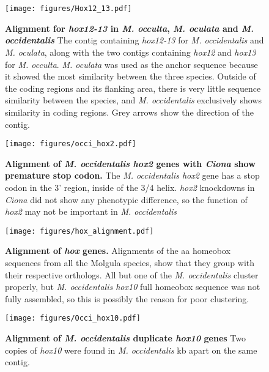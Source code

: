 \chapter{}
\begin{figure}[tbp]
\centering
\texttt{[image: figures/Hox12\_13.pdf]}
\caption{\textbf{Alignment for \textit{hox12-13} in \textit{M. occulta}, \textit{M. oculata} and \textit{M. occidentalis}} The contig containing \textit{hox12-13} for \textit{M. occidentalis} and \textit{M. oculata}, along with the two contigs containing \textit{hox12} and \textit{hox13} for \textit{M. occulta}. \textit{M. oculata} was used as the anchor sequence because it showed the most similarity between the three species. Outside of the coding regions and its flanking area, there is very little sequence similarity between the species, and \textit{M. occidentalis} exclusively shows similarity in coding regions. Grey arrows show the direction of the contig.}
\label{fig:hox12}
\end{figure}

\begin{figure}[thbp]
\centering
\texttt{[image: figures/occi\_hox2.pdf]}
\caption{\textbf{Alignment of \textit{M. occidentalis} \textit{hox2} genes with \textit{Ciona} show  premature stop codon.} The \textit{M. occidentalis hox2} gene has a stop codon in the 3' region, inside of the 3/4 helix. \textit{hox2} knockdowns in \textit{Ciona} did not show any phenotypic difference, so the function of \textit{hox2} may not be important in \textit{M. occidentalis} }
\label{fig:occihox2}
\end{figure}

\begin{figure}[tbp]
\centering
\texttt{[image: figures/hox\_alignment.pdf]}
\caption{\textbf{Alignment of \textit{hox} genes.} Alignments of the aa homeobox sequences from all the Molgula species, show that they group with their respective orthologs. All but one of the \textit{M. occidentalis} cluster properly, but \textit{M. occidentalis hox10} full homeobox sequence was not fully assembled, so this is possibly the reason for poor clustering. }
\label{fig:hox-alignments}
\end{figure}

\begin{figure}[tbp]
\centering
\texttt{[image: figures/Occi\_hox10.pdf]}
\caption{\textbf{Alignment of \textit{M. occidentalis} duplicate \textit{hox10} genes} Two copies of \textit{hox10} were found in \textit{M. occidentalis}  kb apart on the same contig.}
\label{fig:occihox10}
\end{figure}


